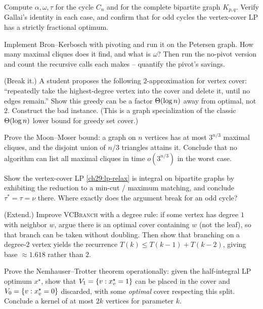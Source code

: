 \begin{exercise}
Compute $\alpha,\omega,\tau$ for the cycle $C_n$ and for the complete bipartite
graph $K_{p,q}$. Verify Gallai's identity in each case, and confirm that for odd
cycles the vertex-cover LP has a strictly fractional optimum.
\end{exercise}

\begin{exercise}
Implement Bron--Kerbosch with pivoting and run it on the Petersen graph. How many
maximal cliques does it find, and what is $\omega$? Then run the no-pivot version
and count the recursive calls each makes -- quantify the pivot's savings.
\end{exercise}

\begin{exercise}
(Break it.) A student proposes the following $2$-approximation for vertex cover:
``repeatedly take the highest-degree vertex into the cover and delete it, until no
edges remain.'' Show this greedy can be a factor $\Theta(\log n)$ away from optimal,
not $2$. Construct the bad instance. (This is a graph specialization of the classic
$\Theta(\log n)$ lower bound for greedy set cover.)
\end{exercise}

\begin{exercise}
Prove the Moon--Moser bound: a graph on $n$ vertices has at most $3^{n/3}$
maximal cliques, and the disjoint union of $n/3$ triangles attains it. Conclude
that no algorithm can list all maximal cliques in time $o(3^{n/3})$ in the worst
case.
\end{exercise}

\begin{exercise}
Show the vertex-cover LP \eqref{ch29:lp-relax} is integral on bipartite graphs by
exhibiting the reduction to a min-cut / maximum matching, and conclude
$\tau^*=\tau=\nu$ there. Where exactly does the argument break for an odd cycle?
\end{exercise}

\begin{exercise}
(Extend.) Improve \textsc{VCBranch} with a degree rule: if some vertex has degree
$1$ with neighbor $w$, argue there is an optimal cover containing $w$ (not the
leaf), so that branch can be taken without doubling. Then show that branching on a
degree-$2$ vertex yields the recurrence $T(k)\le T(k-1)+T(k-2)$, giving base
$\approx 1.618$ rather than $2$.
\end{exercise}

\begin{exercise}
Prove the Nemhauser--Trotter theorem operationally: given the half-integral LP
optimum $x^\star$, show that $V_1=\{v:x^\star_v=1\}$ can be placed in the cover
and $V_0=\{v:x^\star_v=0\}$ discarded, with some \emph{optimal} cover respecting
this split. Conclude a kernel of at most $2k$ vertices for parameter $k$.
\end{exercise}


